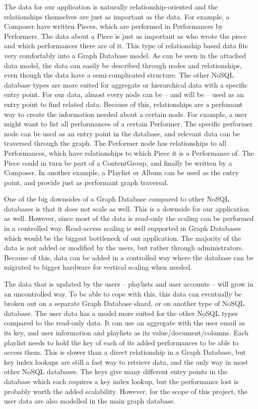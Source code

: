 The data for our application is naturally relationship-oriented and the relationships themselves are
just as important as the data. For example, a Composer have written Pieces, which are performed in
Performances by Performers. The data about a Piece is just as important as who wrote the piece and
which performances there are of it. This type of relationship based data fits very comfortably into
a Graph Database model. As can be seen in the attached data model, the data can easily be described
through nodes and relationships, even though the data have a semi-complicated structure. The other
NoSQL database types are more suited for aggregate or hierarchical data with a specific entry point.
For our data, almost every node can be -- and will be -- used as an entry point to find related
data. Because of this, relationships are a perfomant way to create the information needed about a
certain node. For example, a user might want to list all performances of a certain Performer. The
specific performer node can be used as an entry point in the database, and relevant data can be
traversed through the graph. The Performer node has relationships to all Performances, which have
relationships to which Piece it is a Performance of. The Piece could in turn be part of a
ContentGroup, and finally be written by a Composer. In another example, a Playlist or Album can be
used as the entry point, and provide just as performant graph traversal.

One of the big downsides of a Graph Database compared to other NoSQL databases is that it does not
scale as well. This is a downside for our application as well. However, since most of the data is
read-only the scaling can be performed in a controlled way. Read-access scaling is well supported
in Graph Databases which would be the biggest bottleneck of our application. The majority of the
data is not added or modified by the users, but rather through administrators.
Because of this, data can be added in a controlled way where the database can be migrated to
bigger hardware for vertical scaling when needed.

The data that is updated by the users -- playlists and user accounts -- will grow in an uncontrolled
way. To be able to cope with this, this data can eventually be broken out on a separate Graph
Database shard, or on another type of NoSQL database. The user data has a model more suited for the
other NoSQL types compared to the read-only data. It can use an aggregate with the user email as its
key, and user information and playlists as its value/document/columns.  Each playlist needs to hold
the key of each of its added performances to be able to access them. This is slower than a direct
relationship in a Graph Database, but key index lookups are still a fast way to retrieve data, and
the only way in most other NoSQL databases. The keys give many different entry points in the
database which each requires a key index lookup, but the performance lost is probably worth the
added scalability. However, for the scope of this project, the user data are also modelled in the
main graph database.


